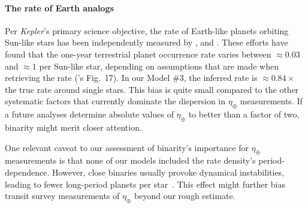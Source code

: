\paragraph{The rate of Earth analogs}
Per {\it Kepler}'s primary science objective, the rate of Earth-like planets 
orbiting Sun-like stars has been independently measured by 
\citet{youdin_exoplanet_2011,petigura_prevalence_2013,dong_fast_2013,
    foreman-mackey_exoplanet_2014}, and \citet{burke_terrestrial_2015}.
These efforts have found that the one-year terrestrial planet occurrence rate 
varies between $\approx 0.03$ and $\approx 1$ per Sun-like star, depending on 
assumptions that are made when retrieving the rate 
(\citet{burke_terrestrial_2015}'s Fig.~17).
In our Model \#3, the inferred rate is $\approx 0.84\times$ the true rate 
around single stars.
This bias is quite small compared to the other systematic factors that 
currently dominate the dispersion in $\eta_\oplus$ measurements.
If a future analyses determine absolute values of $\eta_\oplus$ to 
better than a factor of two, binarity might merit closer attention.

One relevant caveat to our assessment of binarity's importance for 
$\eta_\oplus$ measurements is that none of our models 
included the rate density's period-dependence. However, close binaries usually
provoke dynamical instabilities, leading to fewer long-period planets per 
star~\citep[\textit{e.g.},][]{holman_long-term_1999,wang_influence_2014,
    kraus_impact_2016}.
This effect might further bias transit survey measurements of $\eta_\oplus$
beyond our rough estimate.




